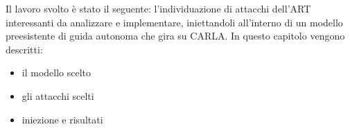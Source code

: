 Il lavoro svolto è stato il seguente:  l'individuazione di attacchi dell'ART interessanti da analizzare e implementare, iniettandoli all'interno di un modello preesistente di guida
autonoma che gira su CARLA. In questo capitolo vengono descritti:\begin{itemize}
    \item il modello scelto
    \item gli attacchi scelti
    \item iniezione e risultati
\end{itemize}






